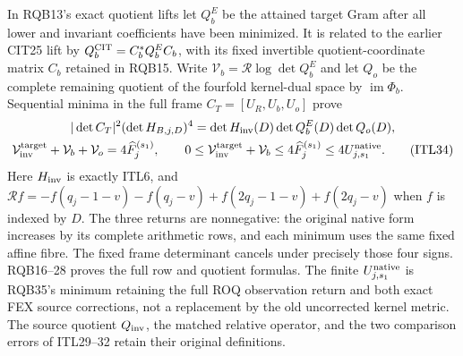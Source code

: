 \documentclass[11pt,a4paper]{article}
\begin{document}
In RQB13's exact quotient lifts let $Q_b^E$ be the attained
target Gram after all lower and invariant coefficients have
been minimized. It is related to the earlier CIT25 lift by
$Q_b^{\rm CIT}=C_b^*Q_b^E C_b$, with its fixed invertible
quotient-coordinate matrix $C_b$ retained in RQB15.
Write $\mathcal V_b=\mathcal R\log\det Q_b^E$ and let
$Q_o$ be the complete remaining quotient of the fourfold
kernel-dual space by $\operatorname{im}\Phi_b$.
Sequential minima in the full frame
$C_T=[U_R,U_b,U_o]$ prove
\[
\begin{gathered}
 |\det C_T|^2(\det H_{B,j,D})^4
       =\det H_{\rm inv}(D)\det Q_b^E(D)\det Q_o(D),\\
 \mathcal V_{\rm inv}^{\rm target}
       +\mathcal V_b+\mathcal V_o=4\widehat F_j^{(s_1)},\qquad
 0\le\mathcal V_{\rm inv}^{\rm target}+\mathcal V_b
       \le4\widehat F_j^{(s_1)}
       \le4U_{j,s_1}^{\rm native}.                            \tag{ITL34}
\end{gathered}
\]
Here $H_{\rm inv}$ is exactly ITL6, and
$\mathcal Rf=-f(q_j-1-v)-f(q_j-v)+f(2q_j-1-v)+f(2q_j-v)$
when $f$ is indexed by $D$.
The three returns are nonnegative: the original native form
increases by its complete arithmetic rows, and each minimum
uses the same fixed affine fibre. The fixed frame determinant
cancels under precisely those four signs. RQB16--28 proves
the full row and quotient formulas. The finite
$U_{j,s_1}^{\rm native}$ is RQB35's minimum retaining the full
ROQ observation return and both exact FEX source corrections,
not a replacement by the old uncorrected kernel metric.
The source quotient $Q_{\rm inv}$, the matched relative
operator, and the two comparison errors of ITL29--32 retain
their original definitions.


\endgroup


\clearpage
\begingroup
\end{document}
